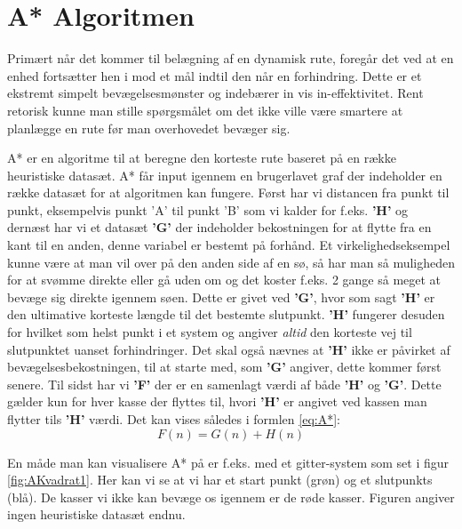 \section{A* Algoritmen}
Primært når det kommer til belægning af en dynamisk rute, foregår det ved at en enhed fortsætter hen i mod et mål indtil den når en forhindring. Dette er et ekstremt simpelt bevægelsesmønster og indebærer in vis in-effektivitet. Rent retorisk kunne man stille spørgsmålet om det ikke ville være smartere at planlægge en rute før man overhovedet bevæger sig.

A* er en algoritme til at beregne den korteste rute baseret på en række heuristiske datasæt. A* får input igennem en brugerlavet graf der indeholder en række datasæt for at algoritmen kan fungere.  Først har vi distancen fra punkt til punkt, eksempelvis punkt 'A' til punkt 'B' som vi kalder for f.eks. \textbf{'H'} og dernæst har vi et datasæt \textbf{'G'} der indeholder bekostningen for at flytte fra en kant til en anden, denne variabel er bestemt på forhånd. Et virkelighedseksempel kunne være at man vil over på den anden side af en sø, så har man så muligheden for at svømme direkte eller gå uden om og det koster f.eks. 2 gange så meget at bevæge sig direkte igennem søen. Dette er givet ved \textbf{'G'}, hvor som sagt \textbf{'H'} er den ultimative korteste længde til det bestemte slutpunkt. \textbf{'H'} fungerer desuden for hvilket som helst punkt i et system og angiver \textit{altid} den korteste vej til slutpunktet uanset forhindringer. Det skal også nævnes at \textbf{'H'} ikke er påvirket af bevægelsesbekostningen, til at starte med, som \textbf{'G'} angiver, dette kommer først senere. Til sidst har vi \textbf{'F'} der er en samenlagt værdi af både \textbf{'H'} og \textbf{'G'}. Dette gælder kun for hver kasse der flyttes til, hvori \textbf{'H'} er angivet ved kassen man flytter tils \textbf{'H'} værdi. Det kan vises således i formlen \ref{eq:A*}:
\begin{equation} \label{eq:A*}
F(n) = G(n) + H(n)
\end{equation}

En måde man kan visualisere A* på er f.eks. med et gitter-system som set i figur \ref{fig:AKvadrat1}. Her kan vi se at vi har et start punkt (grøn) og et slutpunkts (blå). De kasser vi ikke kan bevæge os igennem er de røde kasser. Figuren angiver ingen heuristiske datasæt endnu.

